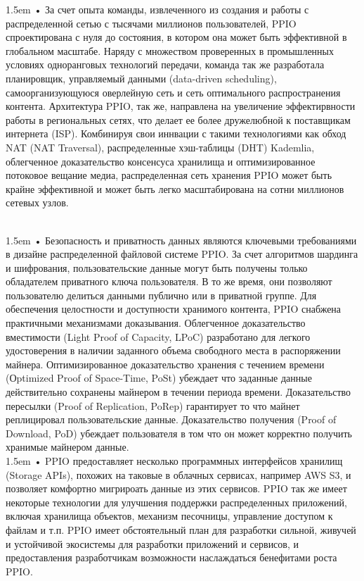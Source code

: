 \documentclass[10pt,a4paper]{article}
\begin{document}
\hangindent 1.5em
\noindent   
• За счет опыта команды, извлеченного из создания и работы с распределенной сетью с тысячами миллионов пользователей, PPIO спроектирована с нуля до состояния, в котором она может быть эффективной в глобальном масштабе. Наряду с множеством проверенных в промышленных условиях одноранговых технологий передачи, команда так же разработала планировщик, управляемый данными (data-driven scheduling), самоорганизующуюся оверлейную сеть и сеть оптимального распространения контента. Архитектура PPIO, так же, направлена на увеличение эффектирвности  работы в региональных сетях, что делает ее более дружелюбной к поставщикам интернета (ISP). Комбинируя свои иннвации с такими технологиями как обход NAT (NAT Traversal), распределенные хэш-таблицы (DHT) Kademlia, облегченное доказательство консенсуса хранилища и оптимизированное потоковое
вещание медиа, распределенная сеть хранения PPIO может быть крайне эффективной и может быть легко масштабирована на сотни миллионов сетевых узлов.
\vspace{-0.6em}
\\ \

\hangindent 1.5em
\noindent   
• Безопасность и приватность данных являются ключевыми требованиями в дизайне распределенной файловой системе PPIO. За счет алгоритмов шардинга и шифрования, пользовательские данные могут быть получены только обладателем приватного ключа пользователя. В то же время, они позволяют пользователю делиться данными публично или в приватной группе. Для обеспечения целостности и доступности хранимого контента, PPIO снабжена практичными механизмами доказывания. Облегченное доказательство вместимости (Light Proof of Capacity, LPoC) разработано для легкого удостоверения в наличии заданного объема свободного места в распоряжении майнера. Оптимизированное доказательство хранения с течением времени (Оptimized Proof of Space-Time, PoSt) убеждает что заданные данные действительно сохранены майнером в течении периода времени. Доказательство пересылки (Proof of Replication, PoRep) гарантирует то что майнет реплицировал пользовательские данные. Доказательство получения (Proof of Download, PoD) убеждает пользователя в том что он может корректно получить хранимые майнером данные.
\vspace{-0.6em}
\\ 

\hangindent 1.5em
\noindent   
• PPIO предоставляет несколько программных интерфейсов хранилищ (Storage APIs), похожих на таковые в облачных сервисах, например AWS S3, и позволяет комфортно мигрироать данные из этих сервисов. PPIO так же имеет некоторые технологии для улучшения поддержки распределенных приложений, включая хранилища объектов, механизм песочницы, управление доступом к файлам и т.п. PPIO имеет обстоятельный план для разработки сильной, живучей и устойчивой экосистемы для разработки приложений и сервисов, и предоставления разработчикам возможности наслаждаться бенефитами роста PPIO.
\vspace{-1em}
\end{document}
